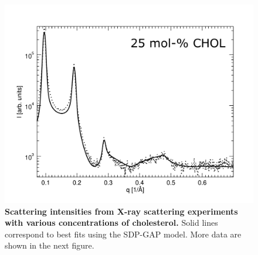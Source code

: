 \documentclass[journal=jpcbfk,manuscript=suppinfo]{achemso}
\begin{document}
\begin{figure}[htb!]
    \includegraphics[width=0.45\linewidth]{../FIGS/scatt25.pdf}
    \caption{\textbf{Scattering intensities from X-ray scattering experiments with various concentrations of cholesterol.} Solid lines correspond to best fits using the SDP-GAP model. More data are shown in the next figure.}
    \label{SIfig:scattering1}
\end{figure}

\clearpage
\end{document}
